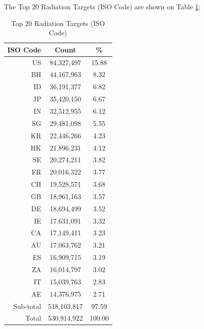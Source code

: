 \newpage
The Top 20 Radiation Targets (ISO Code) are shown on Table \ref{tab:top20radiationtargets(isocode)}:
\begin{table}[!h]
\begin{center}
\caption{Top 20 Radiation Targets (ISO Code)}
\label{tab:top20radiationtargets(isocode)}
\begin{tabular}{ |r|c|c| }
\hline
\centering ISO Code & Count & \%  \\
\hline
US & 84,327,497 & 15.88  \\
BH & 44,167,963 & 8.32  \\
ID & 36,191,377 & 6.82  \\
JP & 35,420,150 & 6.67  \\
IN & 32,512,955 & 6.12  \\
SG & 29,481,098 & 5.55  \\
KR & 22,446,266 & 4.23  \\
HK & 21,896,231 & 4.12  \\
SE & 20,274,211 & 3.82  \\
FR & 20,016,322 & 3.77  \\
CH & 19,528,571 & 3.68  \\
GB & 18,961,163 & 3.57  \\
DE & 18,694,499 & 3.52  \\
IE & 17,631,091 & 3.32  \\
CA & 17,149,411 & 3.23  \\
AU & 17,063,762 & 3.21  \\
ES & 16,909,715 & 3.19  \\
ZA & 16,014,797 & 3.02  \\
IT & 15,039,763 & 2.83  \\
AE & 14,376,975 & 2.71  \\
\hline
Sub-total & 518,103,817 & 97.59  \\
\hline
Total & 530,914,922 & 100.00  \\
\hline
\end{tabular}
\end{center}
\end{table}

